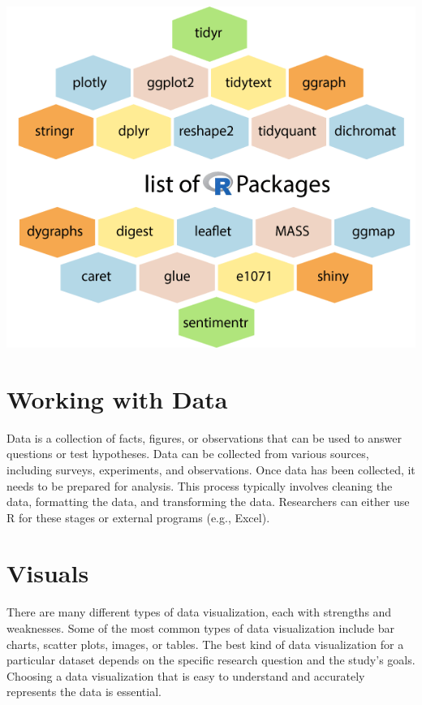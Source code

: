 \documentclass[
  b5paper]{book}
\begin{document}
\includegraphics[width=1\textwidth,height=\textheight]{images/List-of-r-packages.png}

\hypertarget{working-with-data}{%
\section*{Working with Data}\label{working-with-data}}

Data is a collection of facts, figures, or observations that can be used to answer questions or test hypotheses. Data can be collected from various sources, including surveys, experiments, and observations. Once data has been collected, it needs to be prepared for analysis. This process typically involves cleaning the data, formatting the data, and transforming the data. Researchers can either use R for these stages or external programs (e.g., Excel).

\hypertarget{visuals}{%
\section*{Visuals}\label{visuals}}

There are many different types of data visualization, each with strengths and weaknesses. Some of the most common types of data visualization include bar charts, scatter plots, images, or tables. The best kind of data visualization for a particular dataset depends on the specific research question and the study's goals. Choosing a data visualization that is easy to understand and accurately represents the data is essential.
\end{document}
